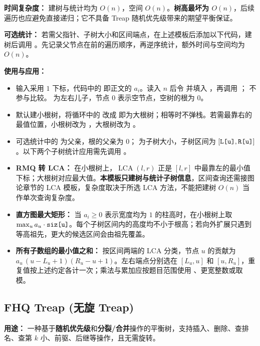 \textbf{时间复杂度：} 建树与统计均为 $O(n)$，空间 $O(n)$。\textbf{树高最坏为 $O(n)$}，后续遍历也应避免直接递归；它不具备 Treap 随机优先级带来的期望平衡保证。



\textbf{可选统计：}
若需父指针、子树大小和区间端点，在上述模板后添加以下代码，建树后调用 。先记录父节点在前的遍历顺序，再逆序统计，额外时间与空间均为 $O(n)$。



\textbf{使用与应用：}
\begin{itemize}
  \item 输入采用 $1$ 下标，代码中的  即正文的 $a_i$。读入 $n$ 后令  并填入 ，再调用 ； 不参与比较。 为左右儿子，节点 $0$ 表示空节点，空树的根为 $0$。
  \item 默认建小根树，将循环中的 \code{>} 改成 \code{<} 即为大根树；相等时不弹栈。若需最靠右的最值位置，小根树改为 \code{>=}，大根树改为 \code{<=}。
  \item 可选统计中的  为父亲，根的父亲为 $0$； 为子树大小，子树区间为 $[\texttt{L[u]},\texttt{R[u]}]$。以下两个子树统计应用需先调用 。
  \item \textbf{RMQ 转 LCA：} 在小根树上，$\operatorname{LCA}(l,r)$ 正是 $[l,r]$ 中最靠左的最小值下标；大根树对应最大值。\textbf{本模板只建树与统计子树信息}，区间查询还需接图论章节的 LCA 模板，复杂度取决于所选 LCA 方法，不能把建树 $O(n)$ 当作单次查询复杂度。
  \item \textbf{直方图最大矩形：} 当 $a_i\ge 0$ 表示宽度均为 $1$ 的柱高时，在小根树上取 $\max_u a_u\cdot\texttt{siz[u]}$。每个子树区间内的高度均不小于根高；若向外扩展只遇到等高祖先，更大的候选区间会由祖先覆盖。
  \item \textbf{所有子数组的最小值之和：} 按区间两端的 LCA 分类，节点 $u$ 的贡献为 $a_u\,(u-L_u+1)(R_u-u+1)$。左右端点分别选在 $[L_u,u]$ 和 $[u,R_u]$，重复值按上述约定各计一次；乘法与累加应按题目范围使用 、更宽整数或取模。
\end{itemize}

\subsection{FHQ Treap (无旋 Treap)}

\textbf{用途：}
一种基于\textbf{随机优先级}和\textbf{分裂/合并}操作的平衡树，支持插入、删除、查排名、查第 $k$ 小、前驱、后继等操作，且无需旋转。

